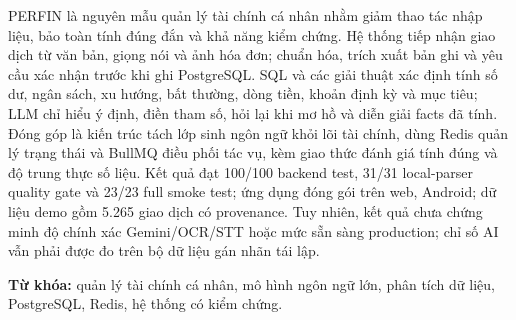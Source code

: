 
PERFIN là nguyên mẫu quản lý tài chính cá nhân nhằm giảm thao tác nhập liệu, bảo toàn tính đúng đắn và khả năng kiểm chứng. Hệ thống tiếp nhận giao dịch từ văn bản, giọng nói và ảnh hóa đơn; chuẩn hóa, trích xuất bản ghi và yêu cầu xác nhận trước khi ghi PostgreSQL. SQL và các giải thuật xác định tính số dư, ngân sách, xu hướng, bất thường, dòng tiền, khoản định kỳ và mục tiêu; LLM chỉ hiểu ý định, điền tham số, hỏi lại khi mơ hồ và diễn giải facts đã tính. Đóng góp là kiến trúc tách lớp sinh ngôn ngữ khỏi lõi tài chính, dùng Redis quản lý trạng thái và BullMQ điều phối tác vụ, kèm giao thức đánh giá tính đúng và độ trung thực số liệu. Kết quả đạt 100/100 backend test, 31/31 local-parser quality gate và 23/23 full smoke test; ứng dụng đóng gói trên web, Android; dữ liệu demo gồm 5.265 giao dịch có provenance. Tuy nhiên, kết quả chưa chứng minh độ chính xác Gemini/OCR/STT hoặc mức sẵn sàng production; chỉ số AI vẫn phải được đo trên bộ dữ liệu gán nhãn tái lập.

\vspace{0.5cm}
\noindent\textbf{Từ khóa:} quản lý tài chính cá nhân, mô hình ngôn ngữ lớn, phân tích dữ liệu, PostgreSQL, Redis, hệ thống có kiểm chứng.
